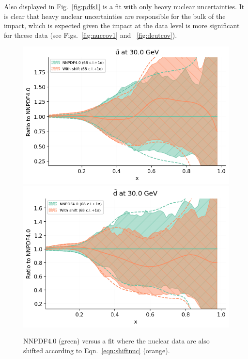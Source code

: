 Also displayed in Fig.~\ref{fig:pdfs1} is a fit with only heavy nuclear uncertainties. It is clear that heavy nuclear uncertainties are responsible for the bulk of the impact, which is expected given the impact at the data level is more significant for thcese data (see Figs.~\ref{fig:nuccov1} and ~\ref{fig:deutcov}).
\begin{figure}[H]
  \begin{center}
      \includegraphics[width=0.49\linewidth]{nuclear/plots/ubar2.png}
     \includegraphics[width=0.49\linewidth]{nuclear/plots/dbar2.png}
    \caption{NNPDF4.0 (green) versus a fit where the nuclear data are also shifted according to Eqn.~\ref{eqn:shiftnuc} (orange).
    \label{fig:pdfs2} }
    \end{center}
\end{figure}   

